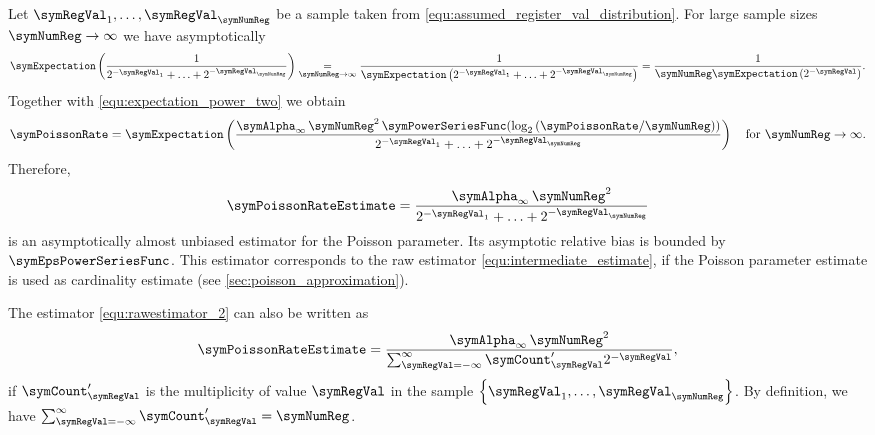 \documentclass[a4paper]{scrartcl}
\begin{document}
Let $\symRegVal_1,\ldots,\symRegVal_\symNumReg$ be a sample taken from \eqref{equ:assumed_register_val_distribution}. For large sample sizes $\symNumReg\rightarrow \infty$ we have asymptotically
\begin{equation}
\symExpectation\left(
\frac{1}{2^{-\symRegVal_1}+\ldots+2^{-\symRegVal_\symNumReg}}
\right)
\underset{\symNumReg\rightarrow \infty}{=}
\frac{1}{\symExpectation
\left(2^{-\symRegVal_1}+\ldots+2^{-\symRegVal_\symNumReg}\right)}
=
\frac{1}{\symNumReg \symExpectation\left(2^{-\symRegVal}\right)}.
\end{equation}
Together with \eqref{equ:expectation_power_two} we obtain
\begin{equation}
\symPoissonRate
=
\symExpectation\left(
\frac{\symAlpha_\infty\,\symNumReg^2\,\symPowerSeriesFunc\!\left(\log_2\left( \symPoissonRate/\symNumReg\right)\right)}{2^{-\symRegVal_1}+\ldots+2^{-\symRegVal_\symNumReg}}
\right)
\quad
\text{for $\symNumReg\rightarrow \infty$}.
\end{equation}
Therefore, 
\begin{equation}
\label{equ:rawestimator_2}
\symPoissonRateEstimate 
= 
\frac{\symAlpha_\infty\,\symNumReg^2}{2^{-\symRegVal_1}+\ldots+2^{-\symRegVal_\symNumReg}}
\end{equation}
is an asymptotically almost unbiased estimator for the Poisson parameter. Its asymptotic relative bias is bounded by $\symEpsPowerSeriesFunc$. This estimator corresponds to the raw estimator \eqref{equ:intermediate_estimate}, if the Poisson parameter estimate is used as cardinality estimate (see \cref{sec:poisson_approximation}).

The estimator \eqref{equ:rawestimator_2} can also be written as
\begin{equation}
\label{equ:raw_estimate_with_multiplicities}
\symPoissonRateEstimate 
= 
\frac{\symAlpha_\infty\,\symNumReg^2}{\sum_{\symRegVal=-\infty}^\infty \symCount'_\symRegVal 2^{-\symRegVal}},
\end{equation}
if $\symCount'_\symRegVal$ is the multiplicity of value $\symRegVal$ in the sample $\left\lbrace \symRegVal_1,\ldots,\symRegVal_\symNumReg\right\rbrace$. 
By definition, we have $\sum_{\symRegVal=-\infty}^\infty \symCount'_\symRegVal = \symNumReg$. 
\end{document}

